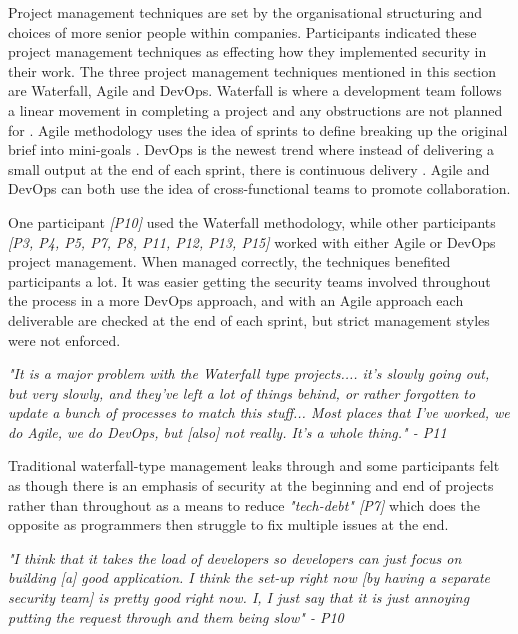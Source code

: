 \par Project management techniques are set by the organisational structuring and choices of more senior people within companies. Participants indicated these project management techniques as effecting how they implemented security in their work. The three project management techniques mentioned in this section are Waterfall, Agile and DevOps. Waterfall is where a development team follows a linear movement in completing a project and any obstructions are not planned for \cite{water} . Agile methodology uses the idea of sprints to define breaking up the original brief into mini-goals \cite{water}. DevOps is the newest trend where instead of delivering a small output at the end of each sprint, there is continuous delivery \cite{ubiq}. Agile and DevOps can both use the idea of cross-functional teams to promote collaboration. 
\newline
\par 
One participant \textit{[P10]} used the Waterfall methodology, while other participants \textit{[P3, P4, P5, P7, P8, P11, P12, P13, P15]} worked with either Agile or DevOps project management. When managed correctly, the techniques benefited participants a lot. It was easier getting the security teams involved throughout the process in a more DevOps approach, and with an Agile approach each deliverable are checked at the end of each sprint, but strict management styles were not enforced. 
\newline
\par
\textit{"It is a major problem with the Waterfall type projects.... it's slowly going out, but very slowly, and they've left a lot of things behind, or rather forgotten to update a bunch of processes to match this stuff... Most places that I've worked, we do Agile, we do DevOps, but [also] not really. It's a whole thing." - P11}
\newline
\par
Traditional waterfall-type management leaks through and some participants felt as though there is an emphasis of security at the beginning and end of projects rather than throughout as a means to reduce \textit{"tech-debt" [P7]} which does the opposite as programmers then struggle to fix multiple issues at the end. 
\newline
\par 
\textit{"I think that it takes the load of developers so developers can just focus on building [a] good application. I think the set-up right now [by having a separate security team] is pretty good right now. I, I just say that it is just annoying putting the request through and them being slow" - P10}
